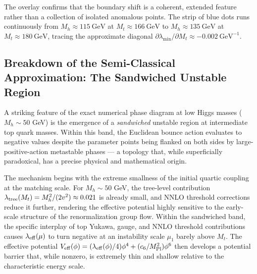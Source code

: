 \documentclass[aps,prd,twocolumn,superscriptaddress,nofootinbib]{revtex4-2}
\begin{document}
The overlay confirms that the boundary shift is a coherent, extended
feature rather than a collection of isolated anomalous points. The strip
of blue dots runs continuously from $M_h \approx 115~\text{GeV}$ at
$M_t \approx 166~\text{GeV}$ to $M_h \approx 135~\text{GeV}$ at
$M_t \approx 180~\text{GeV}$, tracing the approximate diagonal $\partial\lambda_{\min}/\partial M_t \approx -0.002~\text{GeV}^{-1}$.

\subsection{Breakdown of the Semi-Classical Approximation: The Sandwiched Unstable Region}
\label{subsec:sandwiched_unstable}

A striking feature of the exact numerical phase diagram at low Higgs masses ($M_h \sim 50$ GeV) is the emergence of a \textit{sandwiched} unstable region at intermediate top quark masses. Within this band, the Euclidean bounce action evaluates to negative values despite the parameter points being flanked on both sides by large-positive-action metastable phases --- a topology that, while superficially paradoxical, has a precise physical and mathematical origin.

The mechanism begins with the extreme smallness of the initial quartic coupling at the matching scale. For $M_h \sim 50$ GeV, the tree-level contribution $\lambda_{\rm tree}(M_t) = M_h^2/(2v^2) \approx 0.021$ is already small, and NNLO threshold corrections reduce it further, rendering the effective potential highly sensitive to the early-scale structure of the renormalization group flow. Within the sandwiched band, the specific interplay of top Yukawa, gauge, and NNLO threshold contributions causes $\lambda_{\rm eff}(\mu)$ to turn negative at an instability scale $\mu_1$ barely above $M_t$. The effective potential $V_{\rm eff}(\phi) = (\lambda_{\rm eff}(\phi)/4)\phi^4 + (c_6/M_{\rm Pl}^2)\phi^6$ then develops a potential barrier that, while nonzero, is extremely thin and shallow relative to the characteristic energy scale.
\end{document}
